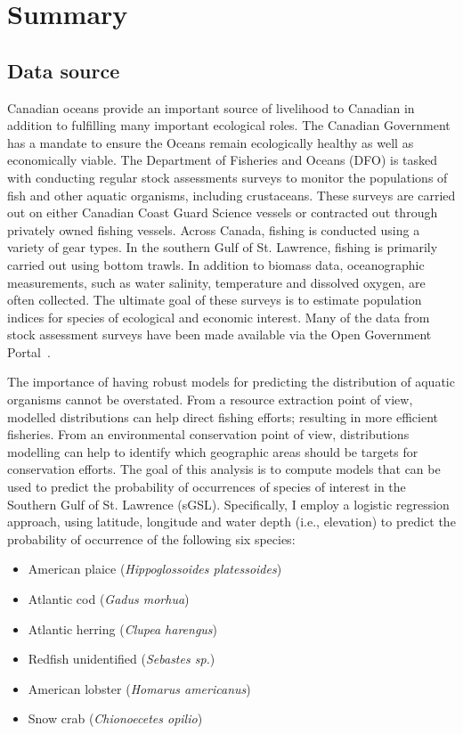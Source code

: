 \section{Summary}

\subsection{Data source}


Canadian oceans provide an important source of livelihood to Canadian in addition to fulfilling many important ecological roles.
The Canadian Government has a mandate to ensure the Oceans remain ecologically healthy as well as economically viable.
The Department of Fisheries and Oceans (DFO) is tasked with conducting regular stock assessments surveys to monitor the populations of fish and other aquatic
organisms, including crustaceans.
These surveys are carried out on either Canadian Coast Guard Science vessels or contracted out through privately owned fishing vessels.
Across Canada, fishing is conducted using a variety of gear types.
In the southern Gulf of St. Lawrence, fishing is primarily carried out using bottom trawls.
In addition to biomass data, oceanographic measurements, such as water salinity, temperature and dissolved oxygen, are often collected.
The ultimate goal of these surveys is to estimate population indices for species of ecological and economic interest.
Many of the data from stock assessment surveys have been made available via the Open Government Portal~\cite{ogp}.


The importance of having robust models for predicting the distribution of aquatic organisms cannot be overstated.
From a resource extraction point of view, modelled distributions can help direct fishing efforts; resulting in more efficient fisheries.
From an environmental conservation point of view, distributions modelling can help to identify which geographic areas should be targets for
conservation efforts.
The goal of this analysis is to compute models that can be used to predict the probability of occurrences of species of interest in the Southern
Gulf of St. Lawrence (sGSL).
Specifically, I employ a logistic regression approach, using latitude, longitude and water depth (i.e., elevation) to predict the probability of
occurrence of the following six species:

\begin{itemize}
    \item American plaice (\textit{Hippoglossoides platessoides})
    \item Atlantic cod (\textit{Gadus morhua})
    \item Atlantic herring (\textit{Clupea harengus})
    \item Redfish unidentified (\textit{Sebastes sp.})
    \item American lobster (\textit{Homarus americanus})
    \item Snow crab (\textit{Chionoecetes opilio})
\end{itemize}

